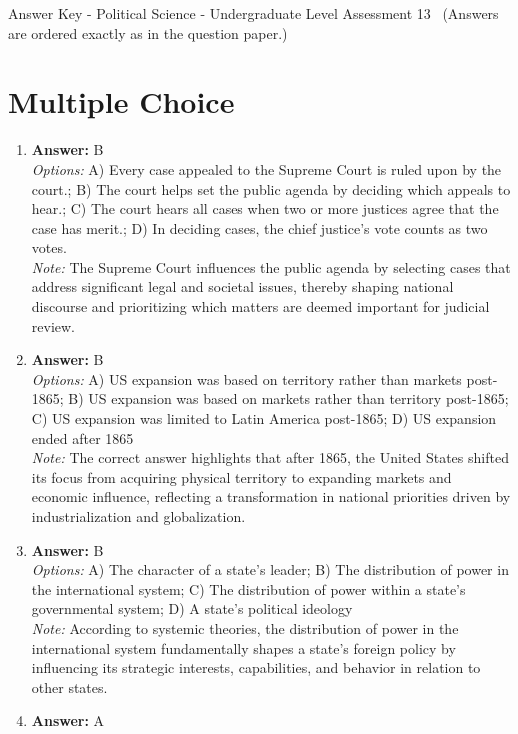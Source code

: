 \documentclass[12pt]{article}
\begin{document}
\begin{center}
Answer Key - Political Science - Undergraduate Level Assessment 13 \
\small (Answers are ordered exactly as in the question paper.)
\end{center}

\section*{Multiple Choice}
\begin{enumerate}[label=\arabic*.]
\item \textbf{Answer:} B
\\ \textit{Options:} A) Every case appealed to the Supreme Court is ruled upon by the court.; B) The court helps set the public agenda by deciding which appeals to hear.; C) The court hears all cases when two or more justices agree that the case has merit.; D) In deciding cases, the chief justice's vote counts as two votes.
\\ \textit{Note:} The Supreme Court influences the public agenda by selecting cases that address significant legal and societal issues, thereby shaping national discourse and prioritizing which matters are deemed important for judicial review.
\item \textbf{Answer:} B
\\ \textit{Options:} A) US expansion was based on territory rather than markets post-1865; B) US expansion was based on markets rather than territory post-1865; C) US expansion was limited to Latin America post-1865; D) US expansion ended after 1865
\\ \textit{Note:} The correct answer highlights that after 1865, the United States shifted its focus from acquiring physical territory to expanding markets and economic influence, reflecting a transformation in national priorities driven by industrialization and globalization.
\item \textbf{Answer:} B
\\ \textit{Options:} A) The character of a state's leader; B) The distribution of power in the international system; C) The distribution of power within a state's governmental system; D) A state's political ideology
\\ \textit{Note:} According to systemic theories, the distribution of power in the international system fundamentally shapes a state's foreign policy by influencing its strategic interests, capabilities, and behavior in relation to other states.
\item \textbf{Answer:} A

\end{enumerate}
\end{document}
